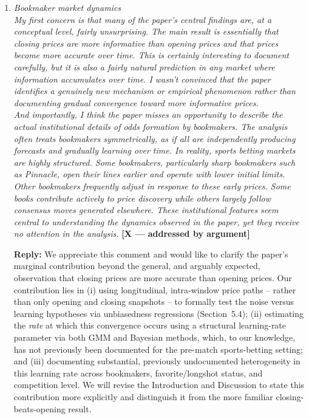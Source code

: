 \documentclass[letterpaper,12pt]{article}
\newcounter{b}
\newcommand{\argX}{\textcolor{green!55!black}{\textbf{[X --- addressed by argument]}}}
\newcommand{\Reply}[1]{\par\noindent\textbf{Reply:} #1}
\begin{document}
\begin{enumerate}
\item \textit{Bookmaker market dynamics\\[6pt]
My first concern is that many of the paper’s central findings are, at a conceptual level,
fairly unsurprising. The main result is essentially that closing prices are more informative
than opening prices and that prices become more accurate over time. This is certainly
interesting to document carefully, but it is also a fairly natural prediction in any market
where information accumulates over time. I wasn’t convinced that the paper identifies a
genuinely new mechanism or empirical phenomenon rather than documenting gradual
convergence toward more informative prices.\\[6pt]
And importantly, I think the paper misses an opportunity to describe the actual
institutional details of odds formation by bookmakers. The analysis often treats
bookmakers symmetrically, as if all are independently producing forecasts and gradually
learning over time. In reality, sports betting markets are highly structured. Some
bookmakers, particularly sharp bookmakers such as Pinnacle, open their lines earlier
and operate with lower initial limits. Other bookmakers frequently adjust in response to
these early prices. Some books contribute actively to price discovery while others largely
follow consensus moves generated elsewhere. These institutional features seem central
to understanding the dynamics observed in the paper, yet they receive no attention in the
analysis. } \argX

\Reply{We appreciate this comment and would like to clarify the paper's marginal contribution beyond the general, and arguably expected, observation that closing prices are more accurate than opening prices. Our contribution lies in (i) using longitudinal, intra-window price paths -- rather than only opening and closing snapshots -- to formally test the noise versus learning hypotheses via unbiasedness regressions (Section~5.4); (ii) estimating the \emph{rate} at which this convergence occurs using a structural learning-rate parameter via both GMM and Bayesian methods, which, to our knowledge, has not previously been documented for the pre-match sports-betting setting; and (iii) documenting substantial, previously undocumented heterogeneity in this learning rate across bookmakers, favorite/longshot status, and competition level. We will revise the Introduction and Discussion to state this contribution more explicitly and distinguish it from the more familiar closing-beats-opening result.

}
\end{enumerate}
\end{document}
